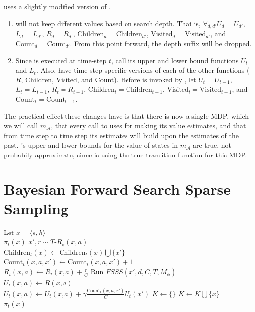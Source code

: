  uses a slightly modified version of .
\begin{enumerate}
\item {} will not keep different values based on search depth. That is, $\forall_{d,d'} U_d = U_{d'}$, $L_d=L_{d'}$, $R_d=R_{d'}$, $\mbox{Children}_d = \mbox{Children}_{d'}$, $\mbox{Visited}_d = \mbox{Visited}_{d'}$, and $\mbox{Count}_d = \mbox{Count}_{d'}$. From this point forward, the depth suffix will be dropped.
\item Since  is executed at time-step $t$, call its upper and lower bound functions $U_t$ and $L_t$. Also, have time-step specific versions of each of the other functions ($R$, Children, Visited, and Count). Before  is invoked by , let $U_t=U_{t-1}$, $L_t=L_{t-1}$, $R_t=R_{t-1}$, $\mbox{Children}_t=\mbox{Children}_{t-1}$, $\mbox{Visited}_t=\mbox{Visited}_{t-1}$, and $\mbox{Count}_t=\mbox{Count}_{t-1}$.
\end{enumerate}

The practical effect these changes have is that there is now a single MDP, which we will call $m_\mathcal{A}$, that every call to  uses for making its value estimates, and that from time step to time step its estimates will build upon the estimates of the past. 's upper and lower bounds for the value of states in $m_\mathcal{A}$ are true, not probabily approximate, since  is using the true transition function for this MDP.

\section{Bayesian Forward Search Sparse Sampling}

\label{sec:bfs3:bfs3}

\begin{algorithm}[tb]
	\caption{$\mbox{BFS3}(t, s, h, d, C, T, \phi)$}
	\label{alg:bfs3}
	Let $x=\langle s, h\rangle$\\
	 {
		\Return $\pi_t(x)$
	}
	 {
		 {
			$x', r \sim {T\mbox{-}R}_\phi(x, a)$\\
			$\mbox{Children}_t(x) \leftarrow \mbox{Children}_t(x) \bigcup \{x'\}$\\
			$\mbox{Count}_t(x, a, x') \leftarrow \mbox{Count}_t(x, a, x')+1$\\
			$R_t(x, a) \leftarrow R_t(x, a) + \frac r C$
		}
		 {
			Run $FSSS(x', d, C, T, M_\phi)$\\
		}
		$U_t(x, a) \leftarrow R(x, a)$\\
		 {
			$U_t(x, a) \leftarrow U_t(x, a) + \gamma \frac {\mbox{Count}_t(x, a, x')} C U_t(x')$
		}
	}
	 {
		$K \leftarrow \{\}$
	}
	$K \leftarrow K \bigcup \{x\}$\\
	\Return $\pi_t(x)$\\
\end{algorithm}


